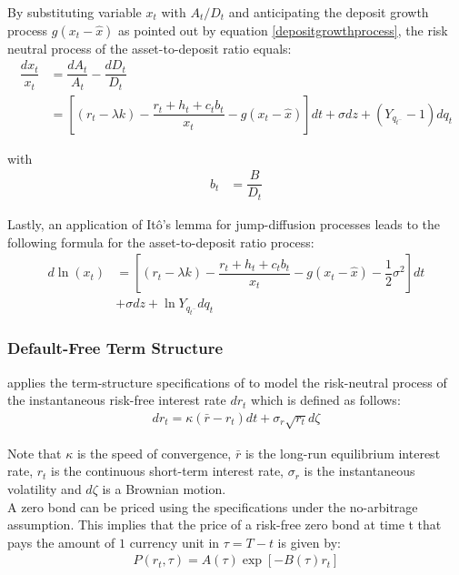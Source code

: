 By substituting variable $x_t$ with $A_t/D_t$ and anticipating the deposit growth process $g\left(x_t - \hat{x}\right)$ as pointed out by equation \ref{depositgrowthprocess}, the risk neutral process of the asset-to-deposit ratio equals:
\begin{align}
\dfrac{dx_t}{x_t}&= \dfrac{dA_t}{A_t} - \dfrac{dD_t}{D_t}\\ \nonumber
&= \left[ \left(r_t - \lambda k \right) - \dfrac{r_t + h_t + c_t b_t}{x_t} - g\left(x_t - \hat{x}\right)\right] dt + \sigma dz + \left( Y_{q_{t^{-}}} - 1 \right) dq_t
\end{align}

with
\begin{align}
b_t &= \dfrac{B}{D_t}
\end{align}

Lastly, an application of It\^{o}'s lemma for jump-diffusion processes leads to the following formula for the asset-to-deposit ratio process:
\begin{align}
d \ln\left(x_t\right) &= \left[ \left( r_t - \lambda k \right) - \dfrac{r_t + h_t + c_t b_t}{x_t} - g\left( x_t - \hat{x} \right) - \dfrac{1}{2} \sigma^2 \right] dt \\ \nonumber
&+ \sigma dz + \ln Y_{q_{t^{-}}} dq_t
\end{align}

\subsubsection*{Default-Free Term Structure}
\label{termstructure}

\citet{pennacchi2010structural} applies the term-structure specifications of \citet{cox1985theory} to model the risk-neutral process of the instantaneous risk-free interest rate $dr_t$ which is defined as follows:
\begin{align}
dr_t = \kappa \left(\bar{r} - r_t \right) dt + \sigma_r \sqrt{r_t} d \zeta
\end{align}

Note that $\kappa$ is the speed of convergence, $\bar{r}$ is the long-run equilibrium interest rate, $r_t$ is the continuous short-term interest rate, $\sigma_r$ is the instantaneous volatility and $d\zeta$ is a Brownian motion.\\

A zero bond can be priced using the \citet{cox1985theory} specifications under the no-arbitrage assumption. This implies that the price of a risk-free zero bond at time t that pays the amount of $1$ currency unit in $\tau = T - t$ is given by:
\begin{align} \label{zerobondprice}
P\left( r_t, \tau \right) = A\left(\tau \right) \exp\left[ - B\left( \tau \right) r_t \right]
\end{align}

